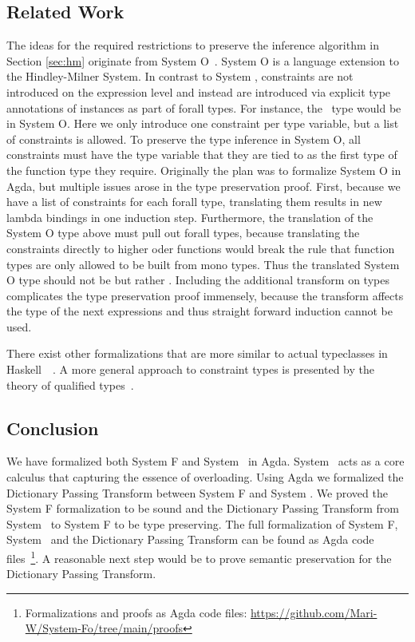 \subsection{Related Work}
The ideas for the required restrictions to preserve the inference algorithm in Section \ref{sec:hm} originate from System O~\cite{syso}. System O is a language extension to the Hindley-Milner System. 
In contrast to System \Fo, constraints are not introduced on the expression level and instead are introduced via explicit type annotations of instances as part of forall types. 
For instance, the \HMo\ type  would be  in System O. 
Here we only introduce one constraint per type variable, but a list of constraints is allowed. 
To preserve the type inference in System O, all constraints must have the type variable that they are tied to as the first type of the function type they require.
Originally the plan was to formalize System O in Agda, but multiple issues arose in the type preservation proof. 
First, because we have a list of  constraints for each forall type, translating them results in  new lambda bindings in one induction step. 
Furthermore, the translation of the System O type above must pull out forall types, because translating the constraints directly to higher oder functions would break the rule that function types are only allowed to be built from mono types. 
Thus the translated System O type should not be  but rather . Including the additional transform on types complicates the type preservation proof immensely, because the transform affects the type of the next  expressions and thus straight forward induction cannot be used.

\noindent There exist other formalizations that are more similar to actual typeclasses in Haskell~\cite{ahp}~\cite{tc}. A more general approach to constraint types is presented by the theory of qualified types~\cite{qt}.

\subsection{Conclusion}
We have formalized both System F and System \Fo\ in Agda. 
System \Fo\ acts as a core calculus that capturing the essence of overloading.
Using Agda we formalized the Dictionary Passing Transform between System F and System \Fo. 
We proved the System F formalization to be sound and the Dictionary Passing Transform from System \Fo\ to System F to be type preserving. The full formalization of System F, System \Fo\ and the Dictionary Passing Transform can be found as Agda code files~\footnote{Formalizations and proofs as Agda code files: \url{https://github.com/Mari-W/System-Fo/tree/main/proofs}}.
A reasonable next step would be to prove semantic preservation for the Dictionary Passing Transform. 